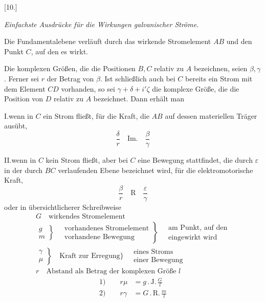 \begin{center}[10.]\par\medskip\textit{Einfachste Ausdrücke für die Wirkungen galvanischer Ströme.}\end{center}
Die Fundamentalebene verläuft durch das wirkende Stromelement $AB$ und den Punkt $C$, auf den es wirkt.

Die komplexen Größen, die die Positionen $B,C$ relativ zu $A$ bezeichnen, seien $\beta,\gamma$. Ferner sei $r$ der Betrag von $\beta$. Ist schließlich auch bei $C$ bereits ein Strom mit dem Element $CD$ vorhanden, so sei $\gamma+\delta+i'\zeta$ die komplexe Größe, die die Position von $D$ relativ zu $A$ bezeichnet. Dann erhält man

I.\quad wenn in $C$ ein Strom fließt, für die Kraft, die $AB$ auf dessen materiellen Träger ausübt,
\[
\frac{\delta}{r}\quad\mathrm{Im.}\quad\frac{\beta}{\gamma}
\]

II.\quad wenn in $C$ kein Strom fließt, aber bei $C$ eine Bewegung stattfindet, die durch $\varepsilon$ in der durch $BC$ verlaufenden Ebene bezeichnet wird, für die elektromotorische Kraft,
\[
\frac{\beta}{r}\quad\mathrm R\quad\frac{\varepsilon}{\gamma}
\]
oder in übersichtlicherer Schreibweise
\[
\begin{gathered}
G\quad\text{wirkendes Stromelement}\\[4pt]
\left.\begin{gathered}g\\m\end{gathered}\right\}\quad
\left.\begin{gathered}\text{vorhandenes Stromelement}\\\text{vorhandene Bewegung}\end{gathered}\right\}\quad
\begin{gathered}\text{am Punkt, auf den}\\\text{eingewirkt wird}\end{gathered}\\[4pt]
\left.\begin{gathered}\gamma\\\mu\end{gathered}\right\}\quad
\text{Kraft zur Erregung}\Bigg\}\quad
\begin{gathered}\text{eines Stroms}\\\text{einer Bewegung}\end{gathered}\\[4pt]
r\quad\text{Abstand als Betrag der komplexen Größe }l
\end{gathered}
\]
\[
\begin{aligned}
\text{1)}\qquad r\mu&=g\,.\,\mathrm{J.}\,\frac{G}{l}\\[4pt]
\text{2)}\qquad r\gamma&=G\,.\,\mathrm{R.}\,\frac{m}{l}
\end{aligned}
\]

